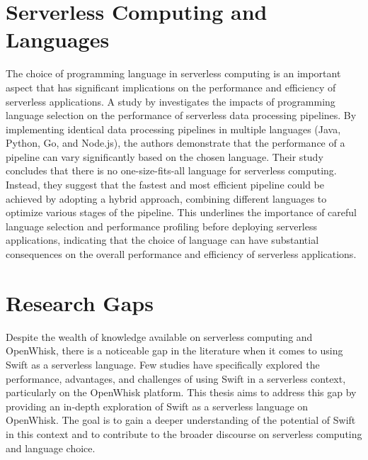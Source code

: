 \section{Serverless Computing and Languages}
The choice of programming language in serverless computing is an important aspect that has significant implications on the performance and efficiency of serverless applications. A study by \cite{implications-prog} investigates the impacts of programming language selection on the performance of serverless data processing pipelines. By implementing identical data processing pipelines in multiple languages (Java, Python, Go, and Node.js), the authors demonstrate that the performance of a pipeline can vary significantly based on the chosen language. Their study concludes that there is no one-size-fits-all language for serverless computing. Instead, they suggest that the fastest and most efficient pipeline could be achieved by adopting a hybrid approach, combining different languages to optimize various stages of the pipeline. This underlines the importance of careful language selection and performance profiling before deploying serverless applications, indicating that the choice of language can have substantial consequences on the overall performance and efficiency of serverless applications.

\section{Research Gaps}
Despite the wealth of knowledge available on serverless computing and OpenWhisk, there is a noticeable gap in the literature when it comes to using Swift as a serverless language. Few studies have specifically explored the performance, advantages, and challenges of using Swift in a serverless context, particularly on the OpenWhisk platform. This thesis aims to address this gap by providing an in-depth exploration of Swift as a serverless language on OpenWhisk. The goal is to gain a deeper understanding of the potential of Swift in this context and to contribute to the broader discourse on serverless computing and language choice.

